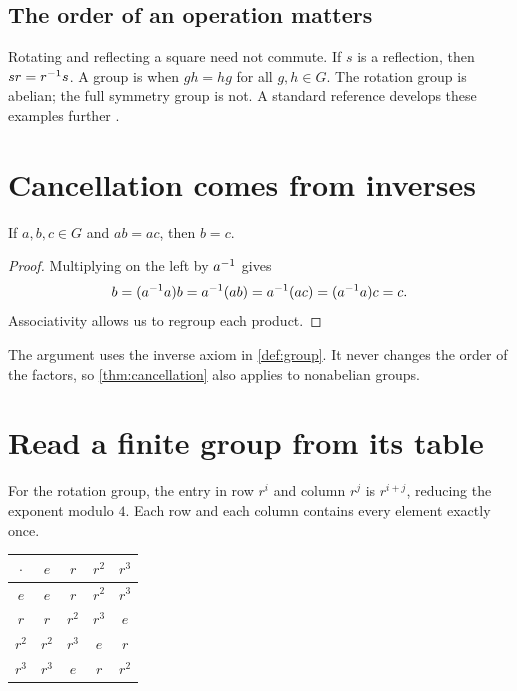 \documentclass[10pt,a4paper,oneside]{scrartcl}
\begin{document}
\subsection{The order of an operation matters}
Rotating and reflecting a square need not commute. If $s$ is a reflection,
then $sr=r^{-1} s$. A group is  when $gh=hg$ for all
$g,h\in G$. The rotation group is abelian; the full symmetry group is not.
A standard reference develops these examples further
.

\section{Cancellation comes from inverses}

\begin{theorem}\label{thm:cancellation}
If $a,b,c\in G$ and $ab=ac$, then $b=c$.
\end{theorem}
\begin{proof}
Multiplying on the left by $a^{-1}$ gives
\[
  b=(a^{-1} a)b=a^{-1}(ab)=a^{-1}(ac)=(a^{-1} a)c=c.
\]
Associativity allows us to regroup each product.
\end{proof}

The argument uses the inverse axiom in \cref{def:group}.
It never changes the order of the factors, so
\cref{thm:cancellation} also applies to nonabelian groups.

\clearpage
\section{Read a finite group from its table}

 For the rotation group, the
entry in row $r^i$ and column $r^j$ is $r^{i+j}$, reducing the exponent
modulo $4$. Each row and each column contains every element exactly once.

\begin{margintable}
\centering
\begin{tabular}{c|cccc}
  \toprule
  $\cdot$ & $e$ & $r$ & $r^2$ & $r^3$ \\
  \midrule
  $e$   & $e$   & $r$   & $r^2$ & $r^3$ \\
  $r$   & $r$   & $r^2$ & $r^3$ & $e$   \\
  $r^2$ & $r^2$ & $r^3$ & $e$   & $r$   \\
  $r^3$ & $r^3$ & $e$   & $r$   & $r^2$ \\
  \bottomrule
\end{tabular}
\caption{The multiplication table of the four rotations.}
\label{tab:rotations}
\end{margintable}
\end{document}
